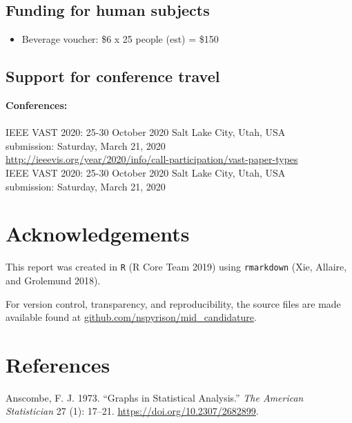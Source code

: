 \documentclass[11,]{article}
\providecommand{\tightlist}{%
  \setlength{\itemsep}{0pt}\setlength{\parskip}{0pt}}
\begin{document}
\hypertarget{funding-for-human-subjects}{%
\subsection{Funding for human subjects}\label{funding-for-human-subjects}}

\begin{itemize}
\tightlist
\item
  Beverage voucher: \$6 x 25 people (est) = \$150
\end{itemize}

\hypertarget{support-for-conference-travel}{%
\subsection{Support for conference travel}\label{support-for-conference-travel}}

\textbf{Conferences:}\\
~\\
IEEE VAST 2020: 25-30 October 2020 Salt Lake City, Utah, USA\\
submission: Saturday, March 21, 2020\\
\url{http://ieeevis.org/year/2020/info/call-participation/vast-paper-types}~\\
IEEE VAST 2020: 25-30 October 2020 Salt Lake City, Utah, USA\\
submission: Saturday, March 21, 2020\\

\hypertarget{sec:acknowledgements}{%
\section{Acknowledgements}\label{sec:acknowledgements}}

This report was created in \texttt{R} (R Core Team 2019) using \texttt{rmarkdown} (Xie, Allaire, and Grolemund 2018).

For version control, transparency, and reproducibility, the source files are made available found at \href{https://github.com/nspyrison/mid_candidature}{github.com/nspyrison/mid\_candidature}.

\hypertarget{references}{%
\section*{References}\label{references}}

\hypertarget{refs}{}
\leavevmode\hypertarget{ref-anscombe_graphs_1973}{}%
Anscombe, F. J. 1973. ``Graphs in Statistical Analysis.'' \emph{The American Statistician} 27 (1): 17--21. \url{https://doi.org/10.2307/2682899}.
\end{document}
